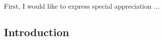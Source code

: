 \documentclass[12pt, oneside, final]{lib/ucthesis}
\def\ssp{\def\baselinestretch{1.0}\large\normalsize}
\begin{document}
\begin{acknowledgements}
\thispagestyle{plain}

First, I would like to express special appreciation ...

\end{acknowledgements}




\begin{dissertationText}
\chapter{Introduction}
	
%	
%	
%  
%  
%  

\ssp	%



%	

\end{dissertationText}
\end{document}
